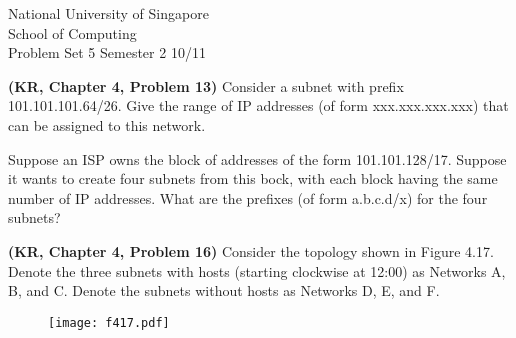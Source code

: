 \documentclass[a4paper,11pt]{exam}
\begin{document}
    \extraheadheight{.5in}
    {\large\sf National University of Singapore\\ School of Computing \\
    \LARGE\sf Problem Set 5}%
    {\large\sf Semester 2 10/11}
    \firstpageheadrule
    \pagestyle{headandfoot}

    \begin{questions}
	\question \textbf{(KR, Chapter 4, Problem 13)}
	Consider a subnet with prefix 101.101.101.64/26.  Give the range
	of IP addresses (of form xxx.xxx.xxx.xxx) that can be
	assigned to this network. 
	
	Suppose an ISP owns the block of
	addresses of the form 101.101.128/17.  Suppose it wants to
	create four subnets from this bock, with each block having the
	same number of IP addresses.  What are the prefixes (of form
	a.b.c.d/x) for the four subnets?

	\question \textbf{(KR, Chapter 4, Problem 16)}
	Consider the topology shown in Figure 4.17.  Denote the three subnets
	with hosts (starting clockwise at 12:00) as Networks A, B, and C.  Denote
	the subnets without hosts as Networks D, E, and F.
	\begin{figure}[h!]
		\begin{center}
	\texttt{[image: f417.pdf]}
		\end{center}
	\end{figure}


\end{questions}
\end{document}
